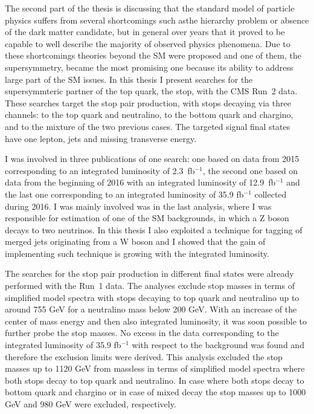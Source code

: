 
The second part of the thesis is discussing that the standard model of particle physics suffers from several shortcomings such asthe hierarchy problem or absence of the dark matter candidate, but in general over years that it proved to be capable to well describe the majority of observed physics phenomena. Due to these shortcomings theories beyond the SM were proposed and one of them, the supersymmetry, became the most promising one because its ability to address large part of the SM issues. In this thesis I present searches for the supersymmteric partner of the top quark, the stop, with the CMS Run~2 data. These searches target the stop pair production, with stops decaying via three channels: to the top quark and neutralino, to the bottom quark and chargino, and to the mixture of the two previous cases. The targeted signal final states have one lepton, jets and missing transverse energy. 

I was involved in three publications of one search: one based on data from 2015 corresponding to an integrated luminosity of 2.3~fb$^{-1}$, the second one based on data from the beginning of 2016 with an integrated luminosity of 12.9~fb$^{-1}$ and the last one corresponding to an integrated luminosity of 35.9 fb$^{-1}$ collected during 2016. I was mainly involved was in the last analysis, where I was responsible for estimation of one of the SM backgrounds, in which a Z boson decays to two neutrinos. In this thesis I also exploited a technique for tagging of merged jets originating from a W boson and I showed that the gain of implementing such technique is growing with the integrated luminosity. 

The searches for the stop pair production in different final states were already performed with the Run~1 data. The analyses exclude stop masses in terms of simplified model spectra with stops decaying to top quark and neutralino up to around 755 GeV for a neutralino mass below 200 GeV. With an increase of the center of mass energy and then also integrated luminosity, it was soon possible to further probe the stop masses. No excess in the data corresponding to the integrated luminosity of 35.9 fb$^{-1}$ with respect to the background was found and therefore the exclusion limits were derived. This analysis excluded the stop masses up to 1120 GeV from massless in terms of simplified model spectra where both stops decay to top quark and neutralino. In case where both stops decay to bottom quark and chargino or in case of mixed decay the stop masses up to 1000 GeV  and 980 GeV were excluded, respectively.

